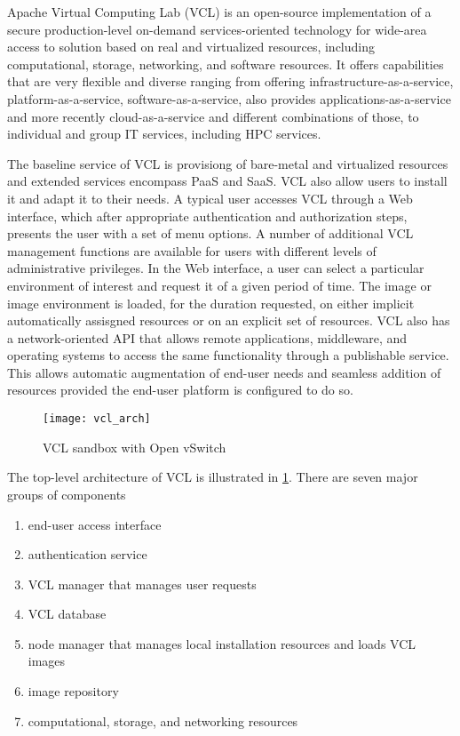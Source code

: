 \documentclass[12pt]{extarticle}
\begin{document}


Apache Virtual Computing Lab (VCL) is an open-source implementation of a secure production-level on-demand services-oriented technology for wide-area access to solution based on real and virtualized resources, including computational, storage, networking, and software resources. It offers capabilities that are very flexible and diverse ranging from offering infrastructure-as-a-service, platform-as-a-service, software-as-a-service, also provides applications-as-a-service and more recently cloud-as-a-service and different combinations of those, to individual and group IT services, including HPC services.

The baseline service of VCL is provisiong of bare-metal and virtualized resources and extended services encompass PaaS and SaaS. VCL also allow users to install it and adapt it to their needs. A typical user accesses VCL through a Web interface, which after appropriate authentication and authorization steps, presents the user with a set of menu options. A number of additional VCL management functions are available for users with different levels of administrative privileges. In the Web interface, a user can select a particular environment of interest and request it of a given period of time. The image or image environment is loaded, for the duration requested, on either implicit automatically assisgned resources or on an explicit set of resources. VCL also has a network-oriented API that allows remote applications, middleware, and operating systems to access the same functionality through a publishable service. This allows automatic augmentation of end-user needs and seamless addition of resources provided the end-user platform is configured to do so.

\begin{figure}[H]
\centering
\texttt{[image: vcl\_arch]}
\caption{VCL sandbox with Open vSwitch}
\label{fig:vclarch}
\end{figure}

The top-level architecture of VCL is illustrated in \ref{fig:vclarch}. There are seven major groups of components 
\begin{enumerate}
    \item end-user access interface
    \item authentication service
    \item VCL manager that manages user requests
    \item VCL database
    \item node manager that manages local installation resources and loads VCL images
    \item image repository
    \item computational, storage, and networking resources
\end{enumerate}
\end{document}
